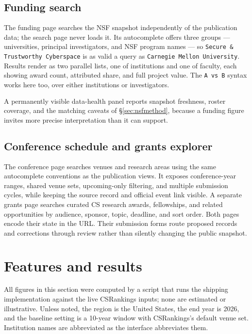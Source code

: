 \documentclass[11pt]{article}
\newcommand{\csr}{CSRankings}
\begin{document}
\subsection{Funding search}
\label{sec:fundingui}

The funding page searches the NSF snapshot independently of the publication
data; the search page never loads it. Its autocomplete offers three groups ---
universities, principal investigators, and NSF program names --- so
\texttt{Secure \& Trustworthy Cyberspace} is as valid a query as
\texttt{Carnegie Mellon University}. Results render as two parallel lists, one
of institutions and one of faculty, each showing award count, attributed share,
and full project value. The \texttt{A vs B} syntax works here too, over either
institutions or investigators.

A permanently visible data-health panel reports snapshot freshness, roster
coverage, and the matching caveats of \S\ref{sec:nsfmethod}, because a funding
figure invites more precise interpretation than it can support.

\subsection{Conference schedule and grants explorer}

The conference page searches venues and research areas using the same
autocomplete conventions as the publication views. It exposes conference-year
ranges, shared venue sets, upcoming-only filtering, and multiple submission
cycles, while keeping the source record and official event link visible. A
separate grants page searches curated CS research awards, fellowships, and
related opportunities by audience, sponsor, topic, deadline, and sort order.
Both pages encode their state in the URL. Their submission forms route proposed
records and corrections through review rather than silently changing the public
snapshot.

\section{Features and results}
\label{sec:results}

All figures in this section were computed by a script that runs the shipping
implementation against the live \csr{} inputs; none are estimated or
illustrative. Unless noted, the region is the United States, the end year is
2026, and the baseline setting is a 10-year window with \csr{}'s default venue
set. Institution names are abbreviated as the interface abbreviates them.
\end{document}
